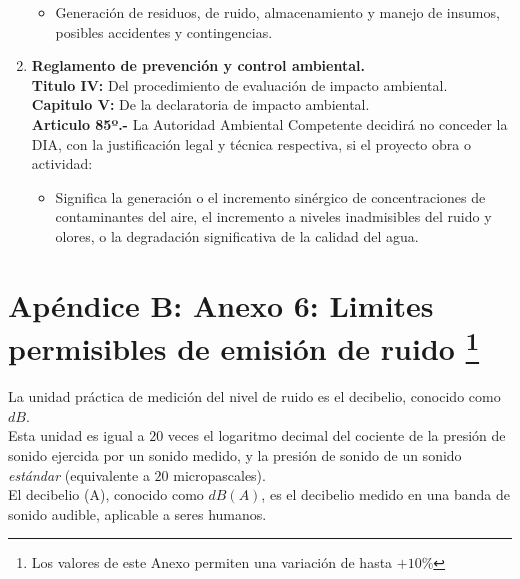 \documentclass[letter,11pt]{article}
\begin{document}
\begin{enumerate}
\begin{itemize}
\item Generación de residuos, de ruido, almacenamiento y manejo de insumos,
posibles accidentes y contingencias.
\end{itemize}

\item
\textbf{Reglamento de prevención y control ambiental.} \\
\textbf{Titulo IV:} Del procedimiento de evaluación de impacto ambiental. \\
\textbf{Capitulo V:} De la declaratoria de impacto ambiental. \\
\textbf{Articulo 85º.-} La Autoridad Ambiental Competente decidirá no conceder
la DIA, con la justificación legal y técnica respectiva, si el proyecto obra o
actividad:

\begin{itemize}
\item Significa la generación o el incremento sinérgico de concentraciones de
contaminantes del aire, el incremento a niveles inadmisibles del ruido y olores,
o la degradación significativa de la calidad del agua.
\end{itemize}

\end{enumerate}

\newpage
\section*{Apéndice B: Anexo 6: Limites permisibles de emisión de ruido
\footnote{Los valores de este Anexo permiten una variación de hasta $+10\%$}}

La unidad práctica de medición del nivel de ruido es el decibelio, conocido como
$dB$. \\

Esta unidad es igual a $20$ veces el logaritmo decimal del cociente de la
presión de sonido ejercida por un sonido medido, y la presión de sonido de un
sonido \emph{estándar} (equivalente a $20$ micropascales). \\

El decibelio (A), conocido como $dB(A)$, es el decibelio medido en una banda de
sonido audible, aplicable a seres humanos. \\
\end{document}
